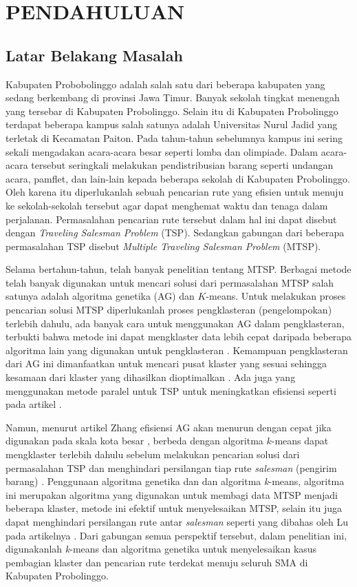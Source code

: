 \chapter{PENDAHULUAN}

\section{Latar Belakang Masalah}

Kabupaten Probobolinggo adalah salah satu dari beberapa kabupaten yang sedang berkembang di provinsi Jawa Timur. Banyak sekolah tingkat menengah yang tersebar di Kabupaten Probolinggo. Selain itu di Kabupaten Probolinggo terdapat beberapa kampus salah satunya adalah Universitas Nurul Jadid yang terletak di Kecamatan Paiton. Pada tahun-tahun sebelumnya kampus ini sering sekali mengadakan acara-acara besar seperti lomba dan olimpiade. Dalam acara-acara tersebut seringkali melakukan pendistribusian barang seperti undangan acara, pamflet, dan lain-lain kepada beberapa sekolah di Kabupaten Probolinggo. Oleh karena itu diperlukanlah sebuah pencarian rute yang efisien untuk menuju ke sekolah-sekolah tersebut agar dapat menghemat waktu dan tenaga dalam perjalanan. Permasalahan pencarian rute tersebut dalam hal ini dapat disebut dengan \textit{Traveling Salesman Problem} (TSP). Sedangkan gabungan dari beberapa permasalahan TSP disebut \textit{Multiple Traveling Salesman Problem} (MTSP).

Selama bertahun-tahun, telah banyak penelitian tentang MTSP. Berbagai metode telah banyak digunakan untuk mencari solusi dari permasalahan MTSP salah satunya adalah algoritma genetika (AG) dan $K$-means. Untuk melakukan proses pencarian solusi MTSP diperlukanlah proses pengklasteran (pengelompokan) terlebih dahulu, ada banyak cara untuk menggunakan AG dalam pengklasteran, terbukti bahwa metode ini dapat mengklaster data lebih cepat daripada beberapa algoritma lain yang digunakan untuk pengklasteran \cite{krishna1999genetic}. Kemampuan pengklasteran dari AG ini dimanfaatkan untuk mencari pusat klaster yang sesuai sehingga kesamaan dari klaster yang dihasilkan dioptimalkan \cite{maii2000genetic}. Ada juga yang menggunakan metode paralel untuk TSP untuk meningkatkan efisiensi seperti pada artikel \cite{li2016parallel}.

Namun, menurut artikel Zhang efisiensi AG akan menurun dengan cepat jika digunakan pada skala kota besar \cite{zhang2014parallel}, berbeda dengan algoritma $k$-means dapat mengklaster terlebih dahulu sebelum melakukan pencarian solusi dari permasalahan TSP dan menghindari persilangan tiap rute \textit{salesman} (pengirim barang) \cite{inproceedings}. Penggunaan algoritma genetika dan dan algoritma \textit{k}-means, algoritma ini merupakan algoritma yang digunakan untuk membagi data MTSP menjadi beberapa klaster, metode ini efektif untuk menyelesaikan MTSP, selain itu juga dapat menghindari persilangan rute antar \textit{salesman} seperti yang dibahas oleh Lu pada artikelnya \cite{inproceedings}. Dari gabungan semua perspektif tersebut, dalam penelitian ini, digunakanlah \textit{k}-means dan algoritma genetika untuk menyelesaikan kasus pembagian klaster dan pencarian rute terdekat menuju seluruh SMA di Kabupaten Probolinggo.

